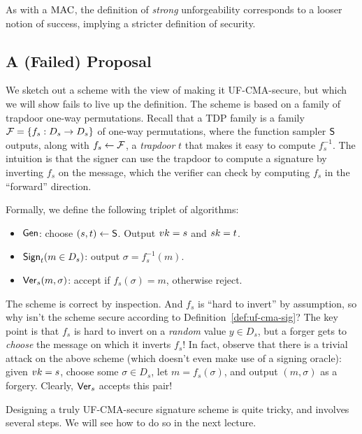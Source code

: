 \documentclass[11pt]{article}
\begin{document}
As with a $\text{MAC}$, the definition of \emph{strong} unforgeability
corresponds to a looser notion of success, implying a stricter
definition of security.

\subsection{A (Failed) Proposal}
\label{sec:failed-proposal}

We sketch out a scheme with the view of making it UF-CMA-secure, but
which we will show fails to live up the definition.  The scheme is
based on a family of trapdoor one-way permutations.  Recall that a TDP
family is a family $\mathcal{F} = \{f_{s} : D_{s} \to D_{s}\}$ of one-way
permutations, where the function sampler $\mathsf{S}$ outputs, along
with $f_{s} \gets \mathcal{F}$, a \emph{trapdoor} $t$ that makes it easy to
compute $f_{s}^{-1}$.  The intuition is that the signer can use the
trapdoor to compute a signature by inverting $f_{s}$ on the message,
which the verifier can check by computing $f_{s}$ in the ``forward''
direction.

Formally, we define the following triplet of algorithms:
\begin{itemize}
\item $\mathsf{Gen}$: choose $(s,t) \gets \mathsf{S}$.  Output $vk = s$ and
  $sk = t$. 
\item $\mathsf{Sign}_{t} (m \in D_{s})$: output $\sigma = f_{s}^{-1}(m)$.
\item $\mathsf{Ver}_{s}(m , \sigma)$: accept if $f_{s}(\sigma) = m$,
  otherwise reject.
\end{itemize}

The scheme is correct by inspection.  And $f_{s}$ is ``hard to
invert'' by assumption, so why isn't the scheme secure according to
Definition~\ref{def:uf-cma-sig}?  The key point is that $f_{s}$ is
hard to invert on a \emph{random} value $y \in D_{s}$, but a forger
gets to \emph{choose} the message on which it inverts $f_{s}$!  In
fact, observe that there is a trivial attack on the above scheme
(which doesn't even make use of a signing oracle): given $vk = s$,
choose some $\sigma \in D_{s}$, let $m = f_{s}(\sigma)$, and output
$(m,\sigma)$ as a forgery.  Clearly, $\mathsf{Ver}_{s}$ accepts this pair!

Designing a truly UF-CMA-secure signature scheme is quite tricky, and
involves several steps.  We will see how to do so in the next lecture.
\end{document}
